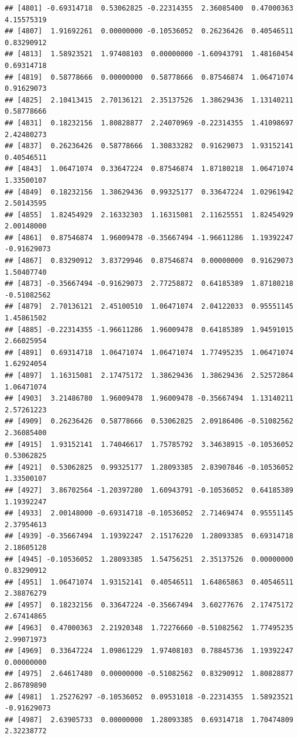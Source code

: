 \documentclass[
]{article}
\begin{document}
\begin{verbatim}
## [4801] -0.69314718  0.53062825 -0.22314355  2.36085400  0.47000363  4.15575319
## [4807]  1.91692261  0.00000000 -0.10536052  0.26236426  0.40546511  0.83290912
## [4813]  1.58923521  1.97408103  0.00000000 -1.60943791  1.48160454  0.69314718
## [4819]  0.58778666  0.00000000  0.58778666  0.87546874  1.06471074  0.91629073
## [4825]  2.10413415  2.70136121  2.35137526  1.38629436  1.13140211  0.58778666
## [4831]  0.18232156  1.80828877  2.24070969 -0.22314355  1.41098697  2.42480273
## [4837]  0.26236426  0.58778666  1.30833282  0.91629073  1.93152141  0.40546511
## [4843]  1.06471074  0.33647224  0.87546874  1.87180218  1.06471074  1.33500107
## [4849]  0.18232156  1.38629436  0.99325177  0.33647224  1.02961942  2.50143595
## [4855]  1.82454929  2.16332303  1.16315081  2.11625551  1.82454929  2.00148000
## [4861]  0.87546874  1.96009478 -0.35667494 -1.96611286  1.19392247 -0.91629073
## [4867]  0.83290912  3.83729946  0.87546874  0.00000000  0.91629073  1.50407740
## [4873] -0.35667494 -0.91629073  2.77258872  0.64185389  1.87180218 -0.51082562
## [4879]  2.70136121  2.45100510  1.06471074  2.04122033  0.95551145  1.45861502
## [4885] -0.22314355 -1.96611286  1.96009478  0.64185389  1.94591015  2.66025954
## [4891]  0.69314718  1.06471074  1.06471074  1.77495235  1.06471074  1.62924054
## [4897]  1.16315081  2.17475172  1.38629436  1.38629436  2.52572864  1.06471074
## [4903]  3.21486780  1.96009478  1.96009478 -0.35667494  1.13140211  2.57261223
## [4909]  0.26236426  0.58778666  0.53062825  2.09186406 -0.51082562  2.36085400
## [4915]  1.93152141  1.74046617  1.75785792  3.34638915 -0.10536052  0.53062825
## [4921]  0.53062825  0.99325177  1.28093385  2.83907846 -0.10536052  1.33500107
## [4927]  3.86702564 -1.20397280  1.60943791 -0.10536052  0.64185389  1.19392247
## [4933]  2.00148000 -0.69314718 -0.10536052  2.71469474  0.95551145  2.37954613
## [4939] -0.35667494  1.19392247  2.15176220  1.28093385  0.69314718  2.18605128
## [4945] -0.10536052  1.28093385  1.54756251  2.35137526  0.00000000  0.83290912
## [4951]  1.06471074  1.93152141  0.40546511  1.64865863  0.40546511  2.38876279
## [4957]  0.18232156  0.33647224 -0.35667494  3.60277676  2.17475172  2.67414865
## [4963]  0.47000363  2.21920348  1.72276660 -0.51082562  1.77495235  2.99071973
## [4969]  0.33647224  1.09861229  1.97408103  0.78845736  1.19392247  0.00000000
## [4975]  2.64617480  0.00000000 -0.51082562  0.83290912  1.80828877  2.86789890
## [4981]  1.25276297 -0.10536052  0.09531018 -0.22314355  1.58923521 -0.91629073
## [4987]  2.63905733  0.00000000  1.28093385  0.69314718  1.70474809  2.32238772

\end{verbatim}
\end{document}
